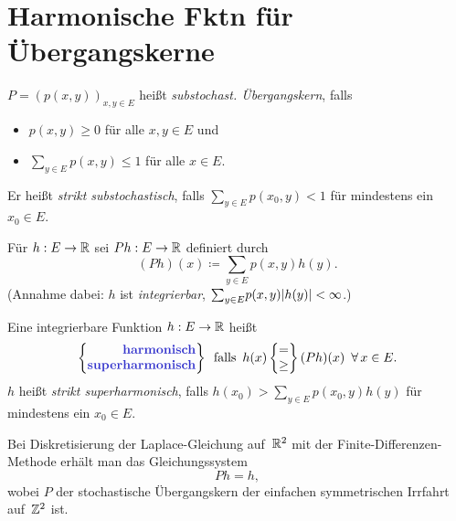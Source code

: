 \documentclass{cheat-sheet}
\begin{document}
\section{Harmonische Fktn für Übergangskerne}


\begin{defn}
  $P = (p(x, y))_{x, y \in E}$ heißt \emph{substochast. Übergangskern}, falls
  \begin{itemize}
    \item $p(x, y) \geq 0$ für alle $x, y \in E$ und
    \item ${\sum}_{y \in E} p(x, y) \leq 1$ für alle $x \in E$.
  \end{itemize}
  Er heißt \textit{strikt substochastisch}, falls ${\sum}_{y \in E} p(x_0, y) < 1$ für mindestens ein $x_0 \in E$.
\end{defn}

\begin{nota}
  Für $h : E \to \mathbb{R}$ sei $P h : E \to \mathbb{R}$ definiert durch
  \[
    (P h)(x) \coloneqq {\sum}_{y \in E} p(x, y) h(y).
  \]
  (Annahme dabei: $h$ ist \textit{integrierbar}, \dh{} ${\sum}_{y \in E} p(x, y) \abs{h(y)} < \infty$.) \\
\end{nota}

\begin{defn}
  Eine integrierbare Funktion $h : E \to \mathbb{R}$ heißt
  \[
    \arraycolsep=0pt
    \left\{ \begin{array}{r}
      \text{\emph{harmonisch}} \\
      \text{\emph{superharmonisch}}
    \end{array} \right\}
    \enspace \text{falls} \enspace
    h(x)
    \left\{ \begin{array}{c}
      = \\
      \geq
    \end{array} \right\}
    (P h)(x)
    \enspace \forall \, x \in E.
  \]
  $h$ heißt \textit{strikt superharmonisch}, falls $h(x_0) > {\sum}_{y \in E} p(x_0, y) h(y)$ für mindestens ein $x_0 \in E$.
\end{defn}

\begin{bsp}
  Bei Diskretisierung der Laplace-Gleichung auf~$\mathbb{R}^2$ mit der Finite-Differenzen-Methode erhält man das Gleichungssystem
  \[ P h = h, \]
  wobei $P$ der stochastische Übergangskern der einfachen symmetrischen Irrfahrt auf~$\mathbb{Z}^2$ ist.
\end{bsp}
\end{document}
